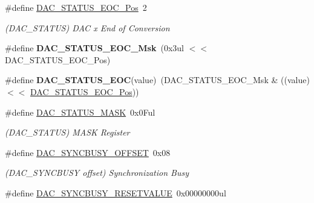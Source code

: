 \begin{DoxyCompactItemize}
\item 
\hypertarget{group___s_a_m_l21___d_a_c_ga8f0382f0b6c03183ecfbb3f71270053d}{}\#define \hyperlink{group___s_a_m_l21___d_a_c_ga8f0382f0b6c03183ecfbb3f71270053d}{D\+A\+C\+\_\+\+S\+T\+A\+T\+U\+S\+\_\+\+E\+O\+C\+\_\+\+Pos}~2\label{group___s_a_m_l21___d_a_c_ga8f0382f0b6c03183ecfbb3f71270053d}

\begin{DoxyCompactList}\small\item\em (D\+A\+C\+\_\+\+S\+T\+A\+T\+U\+S) D\+A\+C x End of Conversion \end{DoxyCompactList}\item 
\hypertarget{group___s_a_m_l21___d_a_c_ga22e23520b3c1107d7c4264bb792fcad3}{}\#define {\bfseries D\+A\+C\+\_\+\+S\+T\+A\+T\+U\+S\+\_\+\+E\+O\+C\+\_\+\+Msk}~(0x3ul $<$$<$ D\+A\+C\+\_\+\+S\+T\+A\+T\+U\+S\+\_\+\+E\+O\+C\+\_\+\+Pos)\label{group___s_a_m_l21___d_a_c_ga22e23520b3c1107d7c4264bb792fcad3}

\item 
\hypertarget{group___s_a_m_l21___d_a_c_ga4038ca5f146ba3331e9a03da7a23745a}{}\#define {\bfseries D\+A\+C\+\_\+\+S\+T\+A\+T\+U\+S\+\_\+\+E\+O\+C}(value)~(D\+A\+C\+\_\+\+S\+T\+A\+T\+U\+S\+\_\+\+E\+O\+C\+\_\+\+Msk \& ((value) $<$$<$ \hyperlink{group___s_a_m_l21___d_a_c_ga8f0382f0b6c03183ecfbb3f71270053d}{D\+A\+C\+\_\+\+S\+T\+A\+T\+U\+S\+\_\+\+E\+O\+C\+\_\+\+Pos}))\label{group___s_a_m_l21___d_a_c_ga4038ca5f146ba3331e9a03da7a23745a}

\item 
\hypertarget{group___s_a_m_l21___d_a_c_ga989b67a3f83996021dc0214e918aaddf}{}\#define \hyperlink{group___s_a_m_l21___d_a_c_ga989b67a3f83996021dc0214e918aaddf}{D\+A\+C\+\_\+\+S\+T\+A\+T\+U\+S\+\_\+\+M\+A\+S\+K}~0x0\+Ful\label{group___s_a_m_l21___d_a_c_ga989b67a3f83996021dc0214e918aaddf}

\begin{DoxyCompactList}\small\item\em (D\+A\+C\+\_\+\+S\+T\+A\+T\+U\+S) M\+A\+S\+K Register \end{DoxyCompactList}\item 
\hypertarget{group___s_a_m_l21___d_a_c_gab524594209eea0ef54d7e77a42be7863}{}\#define \hyperlink{group___s_a_m_l21___d_a_c_gab524594209eea0ef54d7e77a42be7863}{D\+A\+C\+\_\+\+S\+Y\+N\+C\+B\+U\+S\+Y\+\_\+\+O\+F\+F\+S\+E\+T}~0x08\label{group___s_a_m_l21___d_a_c_gab524594209eea0ef54d7e77a42be7863}

\begin{DoxyCompactList}\small\item\em (D\+A\+C\+\_\+\+S\+Y\+N\+C\+B\+U\+S\+Y offset) Synchronization Busy \end{DoxyCompactList}\item 
\hypertarget{group___s_a_m_l21___d_a_c_ga5decef95bed07e847ab4c1b586df8f3d}{}\#define \hyperlink{group___s_a_m_l21___d_a_c_ga5decef95bed07e847ab4c1b586df8f3d}{D\+A\+C\+\_\+\+S\+Y\+N\+C\+B\+U\+S\+Y\+\_\+\+R\+E\+S\+E\+T\+V\+A\+L\+U\+E}~0x00000000ul\label{group___s_a_m_l21___d_a_c_ga5decef95bed07e847ab4c1b586df8f3d}


\end{DoxyCompactItemize}
